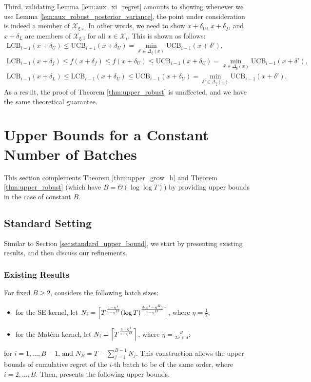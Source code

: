 \documentclass[10pt]{article}
\begin{document}
Third, validating Lemma \ref{lem:aux_xi_regret} amounts to showing whenever we use Lemma \ref{lem:aux_robust_posterior_variance}, the point under consideration is indeed a member of $\mathcal{X}_{\xi, i} $. In other words, we need to show $x+\delta_U$, $x+\delta_f$, and $x+\delta_L$ are members of $\mathcal{X}_{\xi, i}$ for all $x\in\mathcal{X}_i$.
This is shown as follows:
\begin{gather}
    \mathrm{LCB}_{i-1}(x+\delta_U) 
    \leq \mathrm{UCB}_{i-1}(x+\delta_U) 
    = \min_{\delta'\in \Delta_{\xi}(x)}\mathrm{UCB}_{i-1}(x+\delta'), \\
    \mathrm{LCB}_{i-1}(x+\delta_f)
    \leq f(x+\delta_f)
    \leq f(x+\delta_U)
    \leq \mathrm{UCB}_{i-1}(x+\delta_U) 
    = \min_{\delta'\in \Delta_{\xi}(x)}\mathrm{UCB}_{i-1}(x+\delta'), \\
    \mathrm{LCB}_{i-1}(x+\delta_L)
    \leq \mathrm{LCB}_{i-1}(x+\delta_U)
    \leq \mathrm{UCB}_{i-1}(x+\delta_U)
    = \min_{\delta'\in \Delta_{\xi}(x)}\mathrm{UCB}_{i-1}(x+\delta').
\end{gather}
As a result, the proof of Theorem \ref{thm:upper_robust} is unaffected, and we have the same theoretical guarantee.

\section{Upper Bounds for a Constant Number of Batches}
\label{app:fixed_B_upper_bounds}
This section complements Theorem \ref{thm:upper_grow_b} and Theorem \ref{thm:upper_robust} (which have $B=\Theta(\log\log T)$) by providing upper bounds in the case of constant $B$.

\subsection{Standard Setting}
\label{app:standard_fixed_B_upper_bounds}
Similar to Section \ref{sec:standard_upper_bound}, we start by presenting existing results, and then discuss our refinements.
\subsubsection{Existing Results}
\label{app:fixed_B_batch_sizes_li}
For fixed $B\geq 2$, \citep{Li22} considers the following batch sizes:
\begin{itemize}
    \item for the SE kernel, let $N_i =\Bigl\lceil T^{\frac{1-\eta^i}{1-\eta^B}}(\log T)^{\frac{d(\eta^i- \eta^B)}{1-\eta^B}} \Bigr\rceil$, where $\eta=\frac{1}{2}$;
    \item for the Mat\'ern kernel, let $N_i =\Bigl\lceil T^\frac{1-\eta^i}{1-\eta^B}\Bigr\rceil$, where $\eta = \frac{\nu}{2\nu+d}$;
\end{itemize}
for $i=1,\dots,B-1$, and $N_B=T-\sum_{j=1}^{B-1}N_j$. 
This construction allows the upper bounds of cumulative regret of the $i$-th batch to be of the same order, where $i=2,\ldots,B$. Then, \citep{Li22} presents the following upper bounds.
\end{document}
